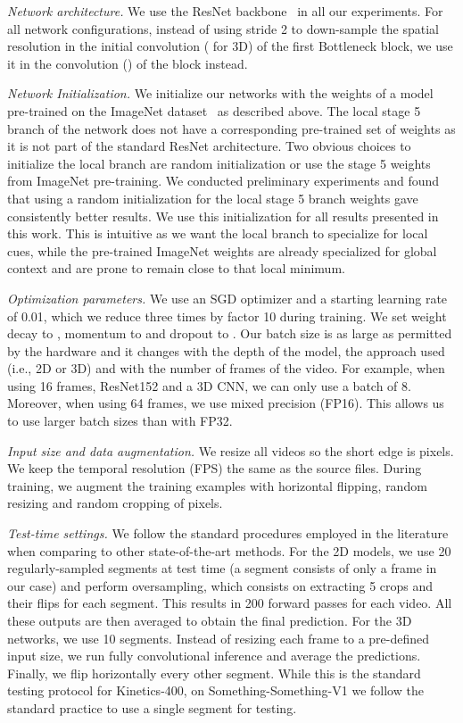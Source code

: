 \documentclass[10pt,twocolumn,letterpaper]{article}
\begin{document}
 
\vspace{2mm}
\textit{Network architecture.} We use the ResNet backbone~\cite{Resnet_CVPR16} in all our experiments. For all network configurations, instead of using stride 2 to down-sample the spatial resolution in the initial  convolution ( for 3D) of the first Bottleneck block, we use it in the  convolution () of the block instead.

\vspace{2mm}
\textit{Network Initialization.} We initialize our networks with the weights of a model pre-trained on the ImageNet dataset~\cite{ImageNet_CVPR09} as described above. 
The local stage 5 branch of the network does not have a corresponding pre-trained set of weights as it is not part of the standard ResNet architecture.  Two obvious choices to initialize the local branch are random initialization or use the stage 5 weights from ImageNet pre-training. We conducted preliminary experiments and found that using a random initialization for the local stage 5 branch weights gave consistently better results. We use this initialization for all results presented in this work. This is intuitive as we want the local branch to specialize for local cues, while the pre-trained ImageNet weights are already specialized for global context and are prone to remain close to that local minimum.

\textit{Optimization parameters.} We use an SGD optimizer and a starting learning rate of 0.01, which we reduce three times by factor 10 during training. We set weight decay to , momentum to  and dropout to . Our batch size is as large as permitted by the hardware and it changes with the depth of the model, the approach used (i.e., 2D or 3D) and with the number of frames of the video. For example, when using 16 frames, ResNet152 and a 3D CNN, we can only use a batch of 8. Moreover, when using 64 frames, we use mixed precision (FP16). This allows us to use larger batch sizes than with FP32.

\textit{Input size and data augmentation.} We resize all videos so the short edge is  pixels. We keep the temporal resolution (FPS) the same as the source files. During training, we augment the training examples with horizontal flipping, random resizing and random cropping of  pixels.

\textit{Test-time settings.} We follow the standard procedures employed in the literature when comparing to other state-of-the-art methods. For the 2D models, we use 20 regularly-sampled segments at test time (a segment consists of only a frame in our case) and perform oversampling, which consists on extracting 5 crops and their flips for each segment. This results in 200 forward passes for each video. All these outputs are then averaged to obtain the final prediction. For the 3D networks, we use 10 segments. Instead of resizing each frame to a pre-defined input size, we run fully convolutional inference and average the predictions. Finally, we flip horizontally every other segment. While this is the standard testing protocol for Kinetics-400, on Something-Something-V1 we follow the standard practice to use a single segment for testing.
\end{document}
